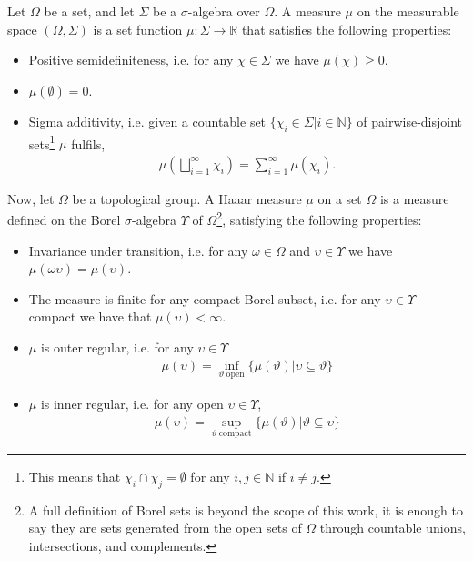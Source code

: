 \documentclass[12pt,letterpaper]{article}
\begin{document}
Let \( \Omega \) be a set, and let \( \Sigma \) be a \( \sigma \)-algebra over \( \Omega \). A measure \( \mu \) on the measurable space \( (\Omega, \Sigma) \) is a set function \( \mu : \Sigma \to \mathbb{R}\) that satisfies the following properties:
\begin{itemize}
	\item Positive semidefiniteness, i.e. for any $\chi\in\Sigma$ we have $\mu(\chi)\geq 0$.
	\item $\mu(\emptyset)=0$.
	\item Sigma additivity, i.e. given a countable set $\{\chi_i\in\Sigma|i\in\mathbb{N}\}$ of pairwise-disjoint sets\footnote{This means that $\chi_i\cap\chi_j=\emptyset$ for any $i,j\in\mathbb{N}$ if $i\neq j$.} $\mu$ fulfils, 
	\begin{align*}
		\mu\left(\bigsqcup_{i=1}^\infty \chi_i\right)=\sum_{i=1}^\infty \mu(\chi_i).
	\end{align*}
\end{itemize}

Now, let \( \Omega \) be a topological group. A Haaar measure $\mu $ on a set $\Omega$ is a measure defined on the Borel $\sigma$-algebra $\Upsilon$ of $\Omega$\footnote{A full definition of Borel sets is beyond the scope of this work, it is enough to say they are sets generated from the open sets of \( \Omega \) through countable unions, intersections, and complements.}, satisfying the following properties:
\begin{itemize}
	\item Invariance under transition, i.e. for any $\omega \in \Omega$ and $\upsilon \in \Upsilon$ we have $\mu(\omega\upsilon)=\mu(\upsilon)$.
	\item The measure is finite for any compact Borel subset, i.e. for any $\upsilon\in\Upsilon$ compact we have that $\mu(\upsilon)<\infty$.
	\item $\mu$ is outer regular, i.e. for any $\upsilon\in\Upsilon$
		\begin{align*}
			\mu(\upsilon)=\inf_{\vartheta\:\text{open}}\{\mu(\vartheta)|\upsilon\subseteq\vartheta\}
		\end{align*}
	\item $\mu$ is inner regular, i.e. for any open $\upsilon\in\Upsilon$,
		\begin{align*}
			\mu(\upsilon)=\sup_{\vartheta\:\text{compact}}\{\mu(\vartheta)|\vartheta\subseteq\upsilon\}
		\end{align*}
\end{itemize}
\end{document}
